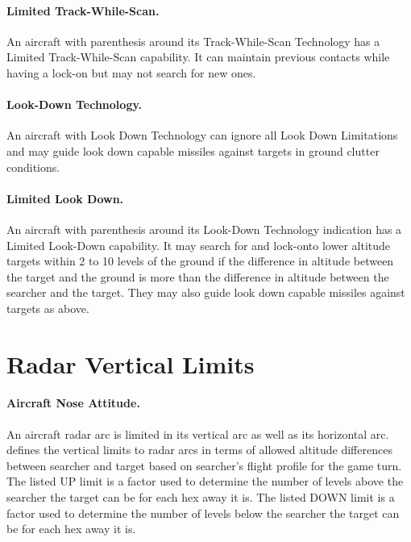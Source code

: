 {\begin{advancedrules}
\paragraph{Limited Track-While-Scan.} An aircraft with parenthesis around its Track-While-Scan Technology has a Limited Track-While-Scan capability. It can maintain previous contacts while having a lock-on but may not search for new ones.

\paragraph{Look-Down Technology.} \label{rule:look-down-missiles}
An aircraft with Look Down Technology can ignore all Look Down Limitations and may guide look down capable missiles against targets in ground clutter conditions.

\paragraph{Limited Look Down.} An aircraft with parenthesis around its Look-Down Technology indication has a Limited Look-Down capability.  It may search for and lock-onto lower altitude targets within 2 to 10 levels of the ground if the difference in altitude between the target and the ground is more than the difference in altitude between the searcher and the target. They may also guide look down capable missiles against targets as above.


\section{Radar Vertical Limits}
\label{rule:radar-vertical-limits}

\paragraph{Aircraft Nose Attitude.} An aircraft radar arc is limited in its vertical arc as well as its horizontal arc.  defines the vertical limits to radar arcs in terms of allowed altitude differences between searcher and target based on searcher's flight profile for the game turn. The listed UP limit is a factor used to determine the number of levels above the searcher the target can be for each hex away it is. The listed DOWN limit is a factor used to determine the number of levels below the searcher the target can be for each hex away it is. 


\end{advancedrules}}
